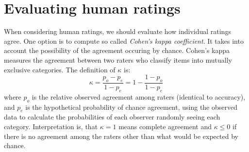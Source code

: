 \section{Evaluating human ratings}
When considering human ratings, we should evaluate how individual ratings agree.
One option is to compute so called \textit{Cohen's kappa coefficient}\cite{cohen1968weighted}.
It takes into account the possibility of the agreement occuring by chance.
Cohen's kappa measures the agreement between two raters who classify items into mutually exclusive categories.
The definition of $\kappa$ is:
\begin{equation}
\kappa = \frac {p_{o}-p_{e}}{1-p_{e}}=1-\frac {1-p_{o}}{1-p_{e}}
\end{equation}
where $p_o$ is the relative observed agreement among raters (identical to accuracy), and $p_e$ is the hypothetical probability of chance agreement, using the observed data to calculate the probabilities of each observer randomly seeing each category.
Interpretation is, that $\kappa = 1$ means complete agreement and $\kappa \leq 0$ if there is no agreement among the raters other than what would be expected by chance. 